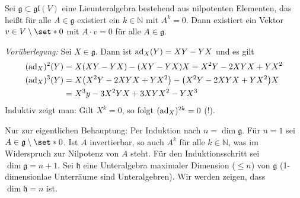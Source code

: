 \begin{lemma}[label=lem:217]
	Sei $\mathfrak{g} \subset \mathfrak{gl}(V)$ eine Lieunteralgebra bestehend aus nilpotenten Elementen, das heißt für alle $A \in \mathfrak{g}$ existiert ein $k \in \mathbb{N}$ mit $A^k=0$.
	Dann existiert ein Vektor $v \in V \setminus \set*{0}$ mit $A \cdot v = 0$ für alle $A \in \mathfrak{g}$.
\end{lemma}
\begin{beweis}
	\emph{Vorüberlegung:} Sei $X \in \mathfrak{g}$. Dann ist $\operatorname{ad}_X(Y) = X Y -Y X$ und es gilt
	\begin{align}
		(\ad_X)^2(Y) &= X \enbrace*{X Y -YX} - \enbrace*{XY -YX}X = X^2 Y - 2XYX+ YX^2 \\
		(\ad_X)^3(Y) &= X \enbrace*{X^2 Y - 2XYX+ YX^2}- \enbrace*{X^2 Y - 2XYX+ YX^2}X \\
		&= X^3 y - 3 X^2YX+3 XYX^2 - YX^3
	\end{align}
	Induktiv zeigt man: Gilt $X^k=0$, so folgt $(\operatorname{ad}_X)^{2k}=0$ (!).
	
	Nur zur eigentlichen Behauptung: Per Induktion nach $n=\dim \mathfrak{g}$. 
	Für $n=1$ sei $A \in \mathfrak{g} \setminus \set*{0}$.
	Ist $A$ invertierbar, so auch $A^k$ für alle $k \in \mathbb{N}$, was im Widerspruch zur Nilpotenz von $A$ steht.
	Für den Induktionsschritt sei $\dim \mathfrak{g} = n+1$.
	Sei $\mathfrak{h}$ eine Unteralgebra maximaler Dimension ($\le n$) von $\mathfrak{g}$ (1-dimensionlae Unterräume sind Unteralgebren).
	Wir werden zeigen, dass $\dim \mathfrak{h}=n$ ist.
	

\end{beweis}
